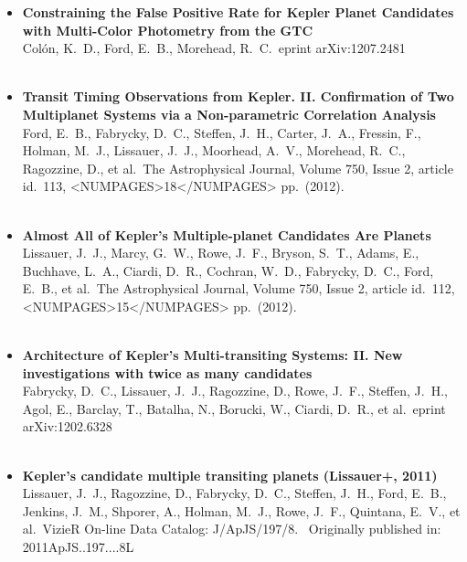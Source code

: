 \documentclass[11pt,letterpaper,sans]{moderncv} %
\begin{document}
\begin{itemize}
 \item \textbf{ Constraining the False Positive Rate for Kepler Planet 
Candidates with Multi-Color Photometry from the GTC } \\ Col{\'o}n, K.~D., 
Ford, E.~B., Morehead, R.~C.\ eprint arXiv:1207.2481 \\ \\ 

 \item \textbf{ Transit Timing Observations from Kepler. II. 
Confirmation of Two Multiplanet Systems via a Non-parametric Correlation 
Analysis } \\ Ford, E.~B., Fabrycky, D.~C., Steffen, J.~H., Carter, J.~A., 
Fressin, F., Holman, M.~J., Lissauer, J.~J., Moorhead, A.~V., Morehead, 
R.~C., Ragozzine, D., et al.\ The Astrophysical Journal, Volume 750, Issue 
2, article id.~113, <NUMPAGES>18</NUMPAGES> pp.~(2012).\ \\ \\ 

 \item \textbf{ Almost All of Kepler's Multiple-planet Candidates Are 
Planets } \\ Lissauer, J.~J., Marcy, G.~W., Rowe, J.~F., Bryson, S.~T., 
Adams, E., Buchhave, L.~A., Ciardi, D.~R., Cochran, W.~D., Fabrycky, D.~C., 
Ford, E.~B., et al.\ The Astrophysical Journal, Volume 750, Issue 2, 
article id.~112, <NUMPAGES>15</NUMPAGES> pp.~(2012).\ \\ \\ 

 \item \textbf{ Architecture of Kepler's Multi-transiting Systems: II. 
New investigations with twice as many candidates } \\ Fabrycky, D.~C., 
Lissauer, J.~J., Ragozzine, D., Rowe, J.~F., Steffen, J.~H., Agol, E., 
Barclay, T., Batalha, N., Borucki, W., Ciardi, D.~R., et al.\ eprint 
arXiv:1202.6328 \\ \\ 

 \item \textbf{ Kepler's candidate multiple transiting planets 
(Lissauer+, 2011) } \\ Lissauer, J.~J., Ragozzine, D., Fabrycky, D.~C., 
Steffen, J.~H., Ford, E.~B., Jenkins, J.~M., Shporer, A., Holman, M.~J., 
Rowe, J.~F., Quintana, E.~V., et al.\ VizieR On-line Data Catalog: 
J/ApJS/197/8.~ Originally published in: 2011ApJS..197....8L \\ \\ 


\end{itemize}
\end{document}
